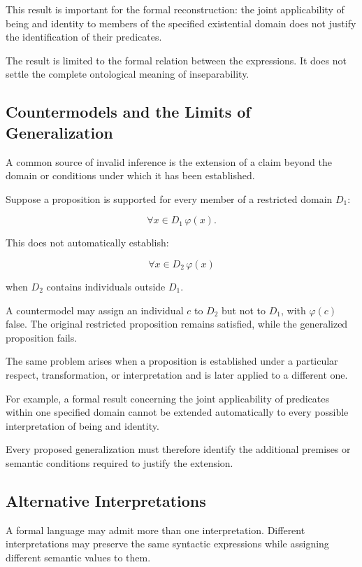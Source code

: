 This result is important for the formal reconstruction:
the joint applicability of being and identity to
members of the specified existential domain does
not justify the identification of their predicates.

The result is limited to the formal relation between
the expressions. It does not settle the complete
ontological meaning of inseparability.

\subsection{Countermodels and the Limits of Generalization}

A common source of invalid inference is the extension
of a claim beyond the domain or conditions under
which it has been established.

Suppose a proposition is supported for every member
of a restricted domain \(D_1\):

\[
    \forall x \in D_1 \, \varphi(x).
\]

This does not automatically establish:

\[
    \forall x \in D_2 \, \varphi(x)
\]

when \(D_2\) contains individuals outside \(D_1\).

A countermodel may assign an individual \(c\) to
\(D_2\) but not to \(D_1\), with \(\varphi(c)\)
false. The original restricted proposition remains
satisfied, while the generalized proposition fails.

The same problem arises when a proposition is established
under a particular respect, transformation, or
interpretation and is later applied to a different
one.

For example, a formal result concerning the joint
applicability of predicates within one specified
domain cannot be extended automatically to every
possible interpretation of being and identity.

Every proposed generalization must therefore identify
the additional premises or semantic conditions
required to justify the extension.

\subsection{Alternative Interpretations}

A formal language may admit more than one interpretation.
Different interpretations may preserve the same
syntactic expressions while assigning different
semantic values to them.

